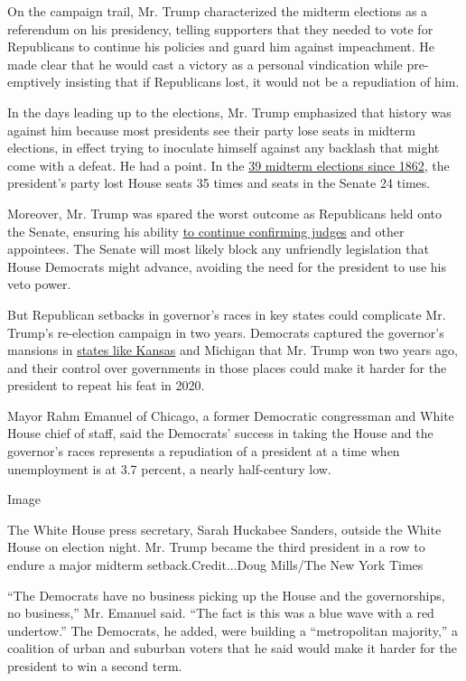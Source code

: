 On the campaign trail, Mr. Trump characterized the midterm elections as
a referendum on his presidency, telling supporters that they needed to
vote for Republicans to continue his policies and guard him against
impeachment. He made clear that he would cast a victory as a personal
vindication while pre-emptively insisting that if Republicans lost, it
would not be a repudiation of him.

In the days leading up to the elections, Mr. Trump emphasized that
history was against him because most presidents see their party lose
seats in midterm elections, in effect trying to inoculate himself
against any backlash that might come with a defeat. He had a point. In
the
\href{https://www.brookings.edu/wp-content/uploads/2017/01/vitalstats_ch2_tbl4.pdf}{39
midterm elections since 1862}, the president's party lost House seats 35
times and seats in the Senate 24 times.

Moreover, Mr. Trump was spared the worst outcome as Republicans held
onto the Senate, ensuring his ability
\href{https://www.nytimes.com/2017/11/11/us/politics/trump-judiciary-appeals-courts-conservatives.html}{to
continue confirming judges} and other appointees. The Senate will most
likely block any unfriendly legislation that House Democrats might
advance, avoiding the need for the president to use his veto power.

But Republican setbacks in governor's races in key states could
complicate Mr. Trump's re-election campaign in two years. Democrats
captured the governor's mansions in
\href{https://www.nytimes.com/2018/11/06/us/laura-kelly-wins-kansas-governors-race.html}{states
like Kansas} and Michigan that Mr. Trump won two years ago, and their
control over governments in those places could make it harder for the
president to repeat his feat in 2020.

Mayor Rahm Emanuel of Chicago, a former Democratic congressman and White
House chief of staff, said the Democrats' success in taking the House
and the governor's races represents a repudiation of a president at a
time when unemployment is at 3.7 percent, a nearly half-century low.

Image

The White House press secretary, Sarah Huckabee Sanders, outside the
White House on election night. Mr. Trump became the third president in a
row to endure a major midterm setback.Credit...Doug Mills/The New York
Times

``The Democrats have no business picking up the House and the
governorships, no business,'' Mr. Emanuel said. ``The fact is this was a
blue wave with a red undertow.'' The Democrats, he added, were building
a ``metropolitan majority,'' a coalition of urban and suburban voters
that he said would make it harder for the president to win a second
term.

